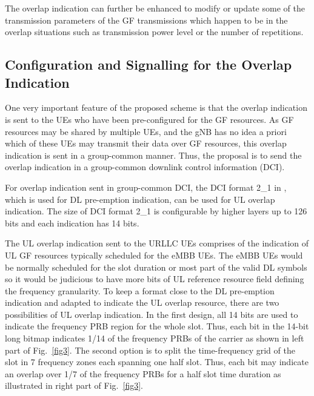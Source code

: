 \documentclass[conference]{IEEEtran}
\begin{document}
The overlap indication can further be enhanced to modify or update some of the transmission parameters of the GF transmissions which happen to be in the overlap situations such as transmission power level or the number of repetitions. 

\subsection{Configuration and Signalling for the Overlap Indication}\label{IICC}
One very important feature of the proposed scheme is that the overlap indication is sent to the UEs who have been pre-configured for the GF resources. As GF resources may be shared by multiple UEs, and the gNB has no idea a priori which of these UEs may transmit their data over GF resources, this overlap indication is sent in a group-common manner. Thus, the proposal is to send the overlap indication in a group-common downlink control information (DCI).

For overlap indication sent in group-common DCI, the DCI format 2\_1 in \cite{ad6}, which is used for DL pre-emption indication, can be used for UL overlap indication. The size of DCI format 2\_1 is configurable by higher layers up to 126 bits and each indication has 14 bits. 

The UL overlap indication sent to the URLLC UEs comprises of the indication of UL GF resources typically scheduled for the eMBB UEs. The eMBB UEs would be normally scheduled for the slot duration or most part of the valid DL symbols so it would be judicious to have more bits of UL reference resource field defining the frequency granularity. To keep a format close to the DL pre-emption indication and adapted to indicate the UL overlap resource, there are two possibilities of UL overlap indication. In the first design, all 14 bits are used to indicate the frequency PRB region for the whole slot. Thus, each bit in the 14-bit long bitmap indicates 1/14 of the frequency PRBs of the carrier as shown in left part of Fig.~\ref{fig3}. The second option is to split the time-frequency grid of the slot in 7 frequency zones each spanning one half slot. Thus, each bit may indicate an overlap over 1/7 of the frequency PRBs for a half slot time duration as illustrated in right part of Fig.~\ref{fig3}. 
\end{document}
